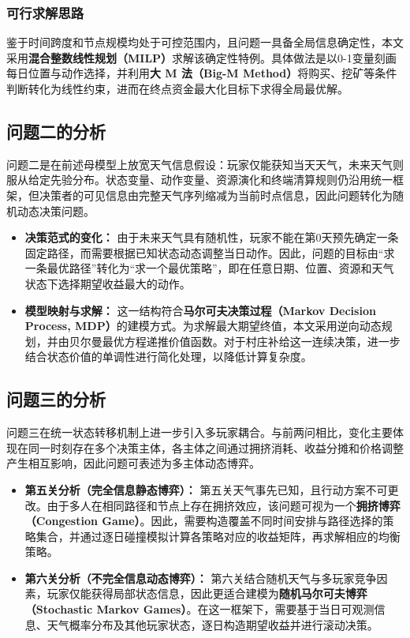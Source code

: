 \documentclass[UTF8,a4paper,12pt]{ctexart}
\begin{document}
\subsubsection{可行求解思路}
鉴于时间跨度和节点规模均处于可控范围内，且问题一具备全局信息确定性，本文采用\textbf{混合整数线性规划（MILP）}求解该确定性特例。具体做法是以0-1变量刻画每日位置与动作选择，并利用\textbf{大 M 法（Big-M Method）}将购买、挖矿等条件判断转化为线性约束，进而在终点资金最大化目标下求得全局最优解。
\subsection{问题二的分析}

问题二是在前述母模型上放宽天气信息假设：玩家仅能获知当天天气，未来天气则服从给定先验分布。状态变量、动作变量、资源演化和终端清算规则仍沿用统一框架，但决策者的可见信息由完整天气序列缩减为当前时点信息，因此问题转化为随机动态决策问题。

\begin{itemize}
    \item \textbf{决策范式的变化：} 由于未来天气具有随机性，玩家不能在第0天预先确定一条固定路径，而需要根据已知状态动态调整当日动作。因此，问题的目标由“求一条最优路径”转化为“求一个最优策略”，即在任意日期、位置、资源和天气状态下选择期望收益最大的动作。
    \item \textbf{模型映射与求解：} 这一结构符合\textbf{马尔可夫决策过程（Markov Decision Process, MDP）}的建模方式。为求解最大期望终值，本文采用逆向动态规划，并由贝尔曼最优方程递推价值函数。对于村庄补给这一连续决策，进一步结合状态价值的单调性进行简化处理，以降低计算复杂度。
\end{itemize}

\subsection{问题三的分析}

问题三在统一状态转移机制上进一步引入多玩家耦合。与前两问相比，变化主要体现在同一时刻存在多个决策主体，各主体之间通过拥挤消耗、收益分摊和价格调整产生相互影响，因此问题可表述为多主体动态博弈。

\begin{itemize}
    \item \textbf{第五关分析（完全信息静态博弈）：} 第五关天气事先已知，且行动方案不可更改。由于多人在相同路径和节点上存在拥挤效应，该问题可视为一个\textbf{拥挤博弈（Congestion Game）}。因此，需要构造覆盖不同时间安排与路径选择的策略集合，并通过逐日碰撞模拟计算各策略对应的收益矩阵，再求解相应的均衡策略。
    
    \item \textbf{第六关分析（不完全信息动态博弈）：} 第六关结合随机天气与多玩家竞争因素，玩家仅能获得局部状态信息，因此更适合建模为\textbf{随机马尔可夫博弈（Stochastic Markov Games）}。在这一框架下，需要基于当日可观测信息、天气概率分布及其他玩家状态，逐日构造期望收益并进行滚动决策。
\end{itemize}
\end{document}
